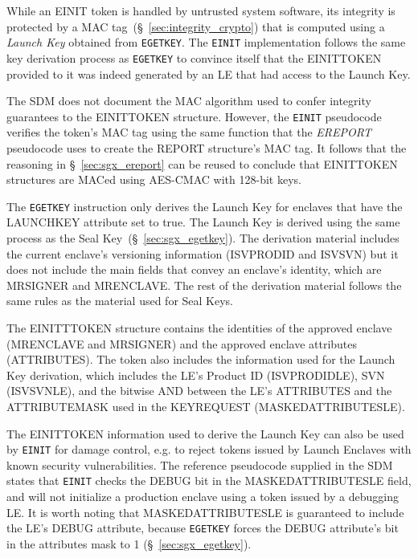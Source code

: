 While an EINIT token is handled by untrusted system software, its integrity is
protected by a MAC tag~(\S~\ref{sec:integrity_crypto}) that is computed using a
\textit{Launch Key} obtained from \texttt{EGETKEY}. The \texttt{EINIT}
implementation follows the same key derivation process as \texttt{EGETKEY} to
convince itself that the EINITTOKEN provided to it was indeed generated by an
LE that had access to the Launch Key.

The SDM does not document the MAC algorithm used to confer integrity guarantees
to the EINITTOKEN structure. However, the \texttt{EINIT} pseudocode verifies
the token's MAC tag using the same function that the \textit{EREPORT}
pseudocode uses to create the REPORT structure's MAC tag. It follows that the
reasoning in \S~\ref{sec:sgx_ereport} can be reused to conclude that EINITTOKEN
structures are MACed using AES-CMAC with 128-bit keys.


The \texttt{EGETKEY} instruction only derives the Launch Key for enclaves that
have the LAUNCHKEY attribute set to true. The Launch Key is derived using the
same process as the Seal Key~(\S~\ref{sec:sgx_egetkey}). The derivation material
includes the current enclave's versioning information (ISVPRODID and ISVSVN)
but it does not include the main fields that convey an enclave's identity,
which are MRSIGNER and MRENCLAVE. The rest of the derivation material follows
the same rules as the material used for Seal Keys.

The EINITTTOKEN structure contains the identities of the approved enclave
(MRENCLAVE and MRSIGNER) and the approved enclave attributes (ATTRIBUTES). The
token also includes the information used for the Launch Key derivation,
which includes the LE's Product ID (ISVPRODIDLE), SVN (ISVSVNLE), and the
bitwise AND between the LE's ATTRIBUTES and the ATTRIBUTEMASK used in the
KEYREQUEST (MASKEDATTRIBUTESLE).

The EINITTOKEN information used to derive the Launch Key can also be used
by \texttt{EINIT} for damage control, e.g. to reject tokens issued by Launch
Enclaves with known security vulnerabilities. The reference pseudocode supplied
in the SDM states that \texttt{EINIT} checks the DEBUG bit in the
MASKEDATTRIBUTESLE field, and will not initialize a production enclave using
a token issued by a debugging LE. It is worth noting that MASKEDATTRIBUTESLE is
guaranteed to include the LE's DEBUG attribute, because \texttt{EGETKEY} forces
the DEBUG attribute's bit in the attributes mask to 1
(\S~\ref{sec:sgx_egetkey}).

